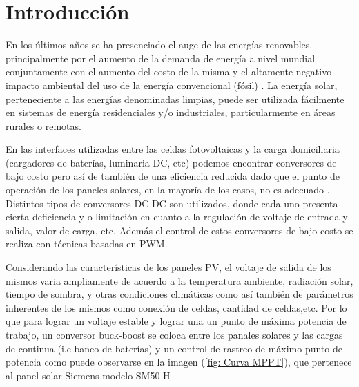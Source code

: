 


\maketitle\thispagestyle{fancy}



\section{Introducción}

    En los últimos años se ha presenciado el auge de las energías renovables, principalmente por el aumento de la demanda de energía a nivel mundial conjuntamente con el aumento del costo de la misma y el altamente negativo impacto ambiental del uso de la energía convencional (fósil) \cite{gallardo2014diseno}. La energía solar, perteneciente a las energías denominadas limpias, puede ser utilizada fácilmente en sistemas de energía  residenciales y/o industriales, particularmente en áreas rurales o remotas. 
    
    En las interfaces utilizadas entre las celdas fotovoltaicas y la carga domiciliaria (cargadores de baterías, luminaria DC, etc) podemos encontrar conversores de bajo costo pero así de también de una eficiencia reducida dado que el punto de operación de los paneles solares, en la mayoría de los casos, no es adecuado \cite{Chang}. Distintos tipos de conversores DC-DC son utilizados, donde cada uno presenta cierta deficiencia y o limitación en cuanto a la regulación de voltaje de entrada y salida, valor de carga, etc. Además el control de estos conversores de bajo costo se realiza con técnicas basadas en PWM. 
    
    Considerando las características de los paneles PV, el voltaje de salida de los mismos varia ampliamente de acuerdo a la temperatura ambiente, radiación solar, tiempo de sombra, y otras condiciones climáticas como así también de parámetros inherentes de los mismos como conexión de celdas, cantidad de celdas,etc. Por lo que para lograr un voltaje estable y lograr una un punto de máxima potencia de trabajo, un conversor buck-boost se coloca entre los panales solares y las cargas de continua (i.e banco de baterías) y un control de rastreo de máximo punto de potencia \cite{Chang} como puede observarse en la imagen (\ref{fig: Curva MPPT}), que pertenece al panel solar \textregistered Siemens modelo SM50-H
    
